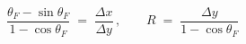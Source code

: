 \documentclass[preview,border=2pt]{standalone}
\begin{document}
$\dfrac{\theta_{F}-\sin\theta_{F}}{1-\cos\theta_{F}}
 \;=\; \dfrac{\Delta x}{\Delta y}\,,\qquad
 R \;=\; \dfrac{\Delta y}{1-\cos\theta_{F}}$
\end{document}
